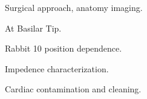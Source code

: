 \documentclass[]{article}
\begin{document}
\begin{figure}[H]
\begin{center}
\caption{Surgical approach, anatomy imaging.}
\end{center}
\end{figure}

\begin{figure}[H]
\begin{center}
\caption{At Basilar Tip.}
\end{center}
\end{figure}

\begin{figure}[H]
\begin{center}
\caption{Rabbit 10 position dependence.}
\end{center}
\end{figure}

\begin{figure}[H]
\begin{center}
\caption{Impedence characterization.}
\end{center}
\end{figure}

\begin{figure}[H]
\begin{center}
\caption{Cardiac contamination and cleaning.}
\end{center}
\end{figure}
\end{document}
